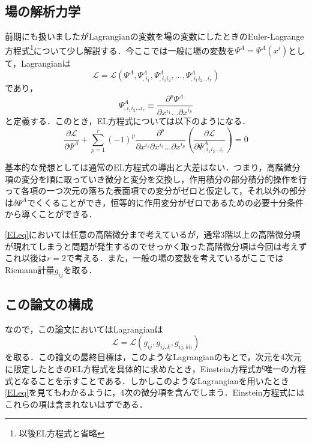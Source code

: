 \documentclass[12pt, a4paper]{jsarticle}
\begin{document}
\subsection{場の解析力学}
前期にも扱いましたがLagrangianの変数を場の変数にしたときのEuler-Lagrange方程式\footnote{以後EL方程式と省略}について少し解説する．今ここでは一般に場の変数を\(\Psi^A = \Psi^A(x^i)\)として，Lagrangianは
\begin{equation*}
  \mathscr{L} = \mathscr{L}( \Psi ^A, \Psi ^A _{,i_1}, \Psi ^A _{,i_1 i_2}, ... , \Psi ^A _{,i_1 i_2 ... i_r})
\end{equation*}
であり，
\begin{equation*}
  \Psi ^A _{,i_1 i_2 ... i_r} \equiv \dfrac{\partial ^p \Psi^A}{\partial x^{i_1} ...\partial x^{i_p}}
\end{equation*}
と定義する．このとき，EL方程式については以下のようになる．
\begin{equation*}
  \dfrac{\partial \mathscr{L}}{\partial \Psi^A} + \sum ^r _{p=1} (-1)^p \dfrac{\partial ^p}{\partial x^{i_1}\partial x^{i_2} ... \partial x^{i_p}}\left( \dfrac{\partial \mathscr{L}}{\partial \Psi ^A _{,i_1 i_2 ... i_r}} \right) =0 \tag{1.2} \label{ELeq}
\end{equation*}

基本的な発想としては通常のEL方程式の導出と大差はない．つまり，高階微分項の変分を順に取っていき微分と変分を交換し，作用積分の部分積分的操作を行って各項の一つ次元の落ちた表面項での変分がゼロと仮定して，それ以外の部分は\(\delta \Psi ^A\)でくくることができ，恒等的に作用変分がゼロであるための必要十分条件から導くことができる．

\eqref{ELeq}においては任意の高階微分まで考えているが，通常3階以上の高階微分項が現れてしまうと問題が発生するのでせっかく取った高階微分項は今回は考えずこれ以後は\(r=2\)で考える．また，一般の場の変数を考えているがここではRiemann計量\(g_{ij}\)を取る．

\subsection{この論文の構成}
なので，この論文においてはLagrangianは
\begin{equation}
  \mathscr{L} = \mathscr{L}(g_{ij}, g_{ij,k}, g_{ij,kh})
  \tag{1.3} \label{lag1}
\end{equation}
を取る．この論文の最終目標は，このようなLagrangianのもとで，次元を4次元に限定したときのEL方程式を具体的に求めたとき，Einstein方程式が唯一の方程式となることを示すことである．しかしこのようなLagrangianを用いたとき\eqref{ELeq}を見てもわかるように，4次の微分項を含んでしまう．Einstein方程式にはこれらの項は含まれないはずである．
\end{document}
